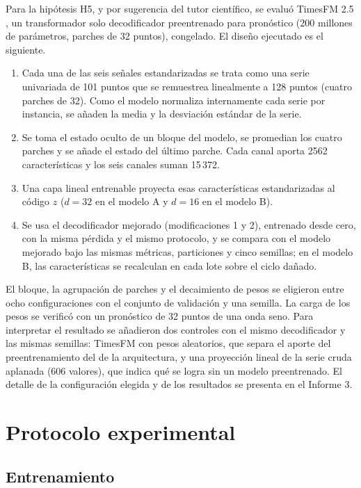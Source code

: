 \documentclass[11pt,a4paper]{article}
\begin{document}
Para la hipótesis H5, y por sugerencia del tutor científico, se evaluó TimesFM 2.5 \cite{das2024timesfm}, un transformador solo decodificador preentrenado para pronóstico (200 millones de parámetros, parches de 32 puntos), congelado. El diseño ejecutado es el siguiente.
\begin{enumerate}
\item Cada una de las seis señales estandarizadas se trata como una serie univariada de 101 puntos que se remuestrea linealmente a 128 puntos (cuatro parches de 32). Como el modelo normaliza internamente cada serie por instancia, se añaden la media y la desviación estándar de la serie.
\item Se toma el estado oculto de un bloque del modelo, se promedian los cuatro parches y se añade el estado del último parche. Cada canal aporta 2562 características y los seis canales suman 15\,372.
\item Una capa lineal entrenable proyecta esas características estandarizadas al código $z$ ($d=32$ en el modelo A y $d=16$ en el modelo B).
\item Se usa el decodificador mejorado (modificaciones 1 y 2), entrenado desde cero, con la misma pérdida y el mismo protocolo, y se compara con el modelo mejorado bajo las mismas métricas, particiones y cinco semillas; en el modelo B, las características se recalculan en cada lote sobre el ciclo dañado.
\end{enumerate}
El bloque, la agrupación de parches y el decaimiento de pesos se eligieron entre ocho configuraciones con el conjunto de validación y una semilla. La carga de los pesos se verificó con un pronóstico de 32 puntos de una onda seno. Para interpretar el resultado se añadieron dos controles con el mismo decodificador y las mismas semillas: TimesFM con pesos aleatorios, que separa el aporte del preentrenamiento del de la arquitectura, y una proyección lineal de la serie cruda aplanada (606 valores), que indica qué se logra sin un modelo preentrenado. El detalle de la configuración elegida y de los resultados se presenta en el Informe 3.

\section{Protocolo experimental}

\subsection{Entrenamiento}
\end{document}
